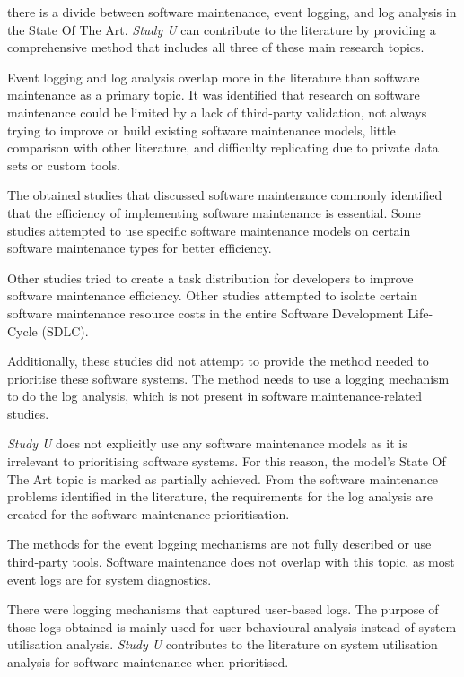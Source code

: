  there is a divide between software maintenance, event logging, and log analysis in the State Of The Art. \textit{Study U} can contribute to the literature by providing a comprehensive method that includes all three of these main research topics. \par Event logging and log analysis overlap more in the literature than software maintenance as a primary topic. It was identified that research on software maintenance could be limited by a lack of third-party validation, not always trying to improve or build existing software maintenance models, little comparison with other literature, and difficulty replicating due to private data sets or custom tools.\par The obtained studies that discussed software maintenance commonly identified that the efficiency of implementing software maintenance is essential. Some studies attempted to use specific software maintenance models on certain software maintenance types for better efficiency. \par Other studies tried to create a task distribution for developers to improve software maintenance efficiency. Other studies attempted to isolate certain software maintenance resource costs in the entire Software Development Life-Cycle (SDLC).\par Additionally, these studies did not attempt to provide the method needed to prioritise these software systems. The method needs to use a logging mechanism to do the log analysis, which is not present in software maintenance-related studies.\par \textit{Study U} does not explicitly use any software maintenance models as it is irrelevant to prioritising software systems. For this reason, the model's State Of The Art topic is marked as partially achieved. From the software maintenance problems identified in the literature, the requirements for the log analysis are created for the software maintenance prioritisation. \par The methods for the event logging mechanisms are not fully described or use third-party tools. Software maintenance does not overlap with this topic, as most event logs are for system diagnostics.\par There were logging mechanisms that captured user-based logs. The purpose of those logs obtained is mainly used for user-behavioural analysis instead of system utilisation analysis. \textit{Study U} contributes to the literature on system utilisation analysis for software maintenance when prioritised.

